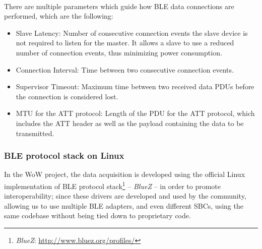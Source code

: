 \paragraph{} There are multiple parameters which guide how \acs{BLE} data connections are performed, which are the following: 
\begin{itemize}
    \item Slave Latency: Number of consecutive connection events the slave device is not required to listen for the master. It allows a slave to use a reduced number of connection events, thus minimizing power consumption.
    \item Connection Interval: Time between two consecutive connection events.
    \item Supervisor Timeout: Maximum time between two received data \acs{PDU}s before the connection is considered lost.
    \item \acf{MTU} for the \acs{ATT} protocol: Length of the \acs{PDU} for the \acs{ATT} protocol, which includes the \acs{ATT} header as well as the payload containing the data to be transmitted.
\end{itemize}

\subsubsection{\acs{BLE} protocol stack on Linux} 

In the \acs{WoW} project, the data acquisition is developed using the official Linux implementation of \acs{BLE} protocol stack\footnote{\textit{BlueZ}: \url{http://www.bluez.org/profiles/}} -- \textit{BlueZ} -- in order to promote interoperability; since these drivers are developed and used by the community, allowing us to use multiple \acs{BLE} adapters, and even different \acs{SBC}s, using the same codebase without being tied down to proprietary code. 




